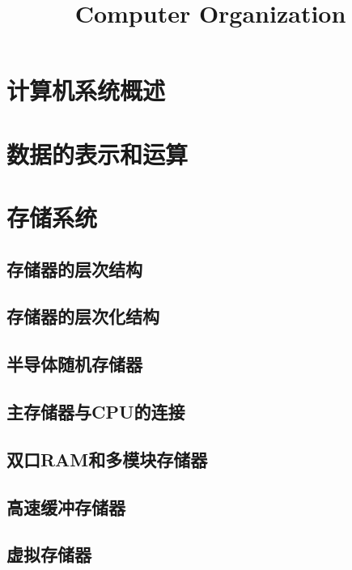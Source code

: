 \documentclass{ctexart}
\title{Computer Organization}
\author{}
\date{}
\begin{document}
\maketitle

\newpage

\tableofcontents

\section{计算机系统概述}





\section{数据的表示和运算}




\section{存储系统}

\subsection{存储器的层次结构}

\subsection{存储器的层次化结构}

\subsection{半导体随机存储器}

\subsection{主存储器与CPU的连接}

\subsection{双口RAM和多模块存储器}

\subsection{高速缓冲存储器}

\subsection{虚拟存储器}
\end{document}
